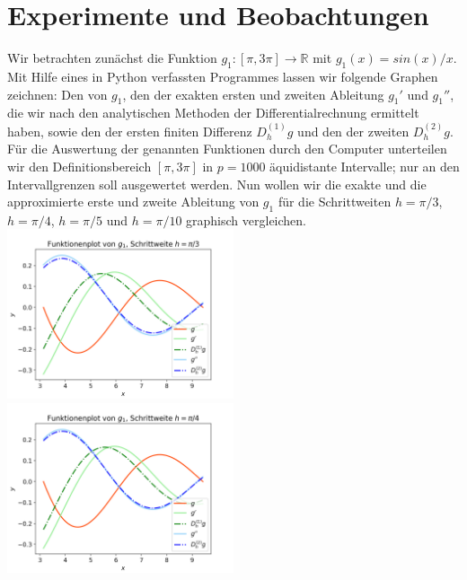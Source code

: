 \documentclass{scrartcl}
\begin{document}
\pagebreak \section{Experimente und Beobachtungen}
\label{sec:experimente}

Wir betrachten zunächst die Funktion $g_1:[\pi, 3\pi] \rightarrow \mathbb{R}$ mit $g_1(x) = sin(x)/x$. Mit Hilfe eines in Python verfassten Programmes lassen wir folgende Graphen zeichnen:
Den von $g_1$, den der exakten ersten und zweiten Ableitung $g_1'$ und $g_1''$, die wir nach den analytischen Methoden der Differentialrechnung ermittelt haben, sowie den der ersten finiten Differenz $D_h^{(1)}g$ und den der zweiten $D_h^{(2)}g$.
Für die Auswertung der genannten Funktionen durch den Computer unterteilen wir den Definitionsbereich $[\pi, 3\pi]$ in $p = 1000$ äquidistante Intervalle; nur an den Intervallgrenzen soll ausgewertet werden.
Nun wollen wir die exakte und die approximierte erste und zweite Ableitung von $g_1$ für die Schrittweiten $h = \pi/3$, $h = \pi/4$, $h = \pi/5$ und $h = \pi/10$ graphisch vergleichen. \\
\includegraphics[width=0.5\textwidth]{Grafiken/Funktionenplot_Pi_Drittel} \includegraphics[width=0.5\textwidth]{Grafiken/Funktionenplot_Pi_Viertel}\\
\end{document}
